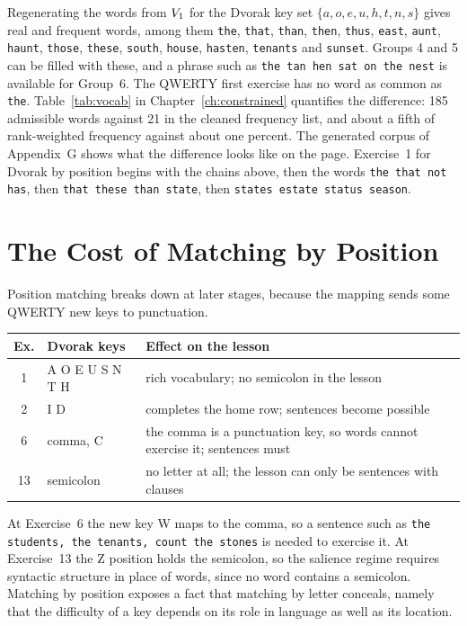 Regenerating the words from $V_1$ for the Dvorak key set $\{a,o,e,u,h,t,n,s\}$ gives real and frequent words, among them \texttt{the}, \texttt{that}, \texttt{than}, \texttt{then}, \texttt{thus}, \texttt{east}, \texttt{aunt}, \texttt{haunt}, \texttt{those}, \texttt{these}, \texttt{south}, \texttt{house}, \texttt{hasten}, \texttt{tenants} and \texttt{sunset}. Groups 4 and 5 can be filled with these, and a phrase such as \texttt{the tan hen sat on the nest} is available for Group~6. The QWERTY first exercise has no word as common as \texttt{the}. Table~\ref{tab:vocab} in Chapter~\ref{ch:constrained} quantifies the difference: 185 admissible words against 21 in the cleaned frequency list, and about a fifth of rank-weighted frequency against about one percent. The generated corpus of Appendix~G shows what the difference looks like on the page. Exercise~1 for Dvorak by position begins with the chains above, then the words \texttt{the that not has}, then \texttt{that these than state}, then \texttt{states estate status season}.

\section{The Cost of Matching by Position}

Position matching breaks down at later stages, because the mapping sends some QWERTY new keys to punctuation.

\begin{center}
\begin{tabular}{@{}clp{6.8cm}@{}}
\toprule
Ex. & Dvorak keys & Effect on the lesson \\
\midrule
1 & A O E U S N T H & rich vocabulary; no semicolon in the lesson \\
2 & I D & completes the home row; sentences become possible \\
6 & comma, C & the comma is a punctuation key, so words cannot exercise it; sentences must \\
13 & semicolon & no letter at all; the lesson can only be sentences with clauses \\
\bottomrule
\end{tabular}
\end{center}

At Exercise~6 the new key W maps to the comma, so a sentence such as \texttt{the students, the tenants, count the stones} is needed to exercise it. At Exercise~13 the Z position holds the semicolon, so the salience regime requires syntactic structure in place of words, since no word contains a semicolon. Matching by position exposes a fact that matching by letter conceals, namely that the difficulty of a key depends on its role in language as well as its location.

